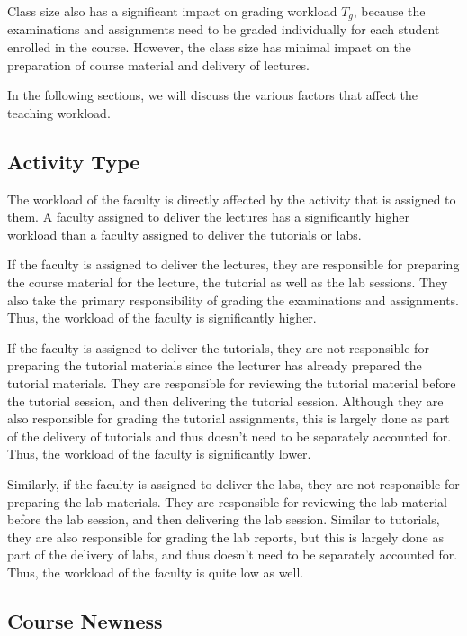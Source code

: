 Class size also has a significant impact on grading workload \( T_g \), because the examinations and assignments need to be graded individually for each student enrolled in the course. However, the class size has minimal impact on the preparation of course material and delivery of lectures.

In the following sections, we will discuss the various factors that affect the teaching workload.

\subsection{Activity Type}
\label{sec:activity_type}

The workload of the faculty is directly affected by the activity that is assigned to them. A faculty assigned to deliver the lectures has a significantly higher workload than a faculty assigned to deliver the tutorials or labs.

If the faculty is assigned to deliver the lectures, they are responsible for preparing the course material for the lecture, the tutorial as well as the lab sessions. They also take the primary responsibility of grading the examinations and assignments. Thus, the workload of the faculty is significantly higher.

If the faculty is assigned to deliver the tutorials, they are not responsible for preparing the tutorial materials since the lecturer has already prepared the tutorial materials. They are responsible for reviewing the tutorial material before the tutorial session, and then delivering the tutorial session. Although they are also responsible for grading the tutorial assignments, this is largely done as part of the delivery of tutorials and thus doesn't need to be separately accounted for. Thus, the workload of the faculty is significantly lower.

Similarly, if the faculty is assigned to deliver the labs, they are not responsible for preparing the lab materials. They are responsible for reviewing the lab material before the lab session, and then delivering the lab session. Similar to tutorials, they are also responsible for grading the lab reports, but this is largely done as part of the delivery of labs, and thus doesn't need to be separately accounted for. Thus, the workload of the faculty is quite low as well.

\subsection{Course Newness}

